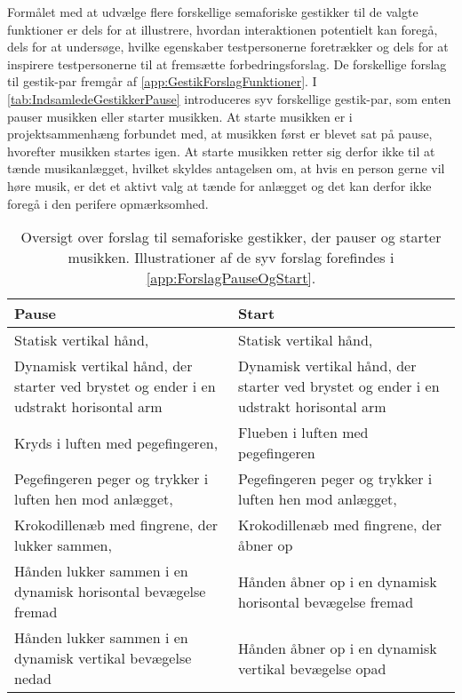 Formålet med at udvælge flere forskellige semaforiske gestikker til de valgte funktioner er dels for at illustrere, hvordan interaktionen potentielt kan foregå, dels for at undersøge, hvilke egenskaber testpersonerne foretrækker og dels for at inspirere testpersonerne til at fremsætte forbedringsforslag. De forskellige forslag til gestik-par fremgår af \autoref{app:GestikForslagFunktioner}.\blankline
%
I \autoref{tab:IndsamledeGestikkerPause} introduceres syv forskellige gestik-par, som enten pauser musikken eller starter musikken. At starte musikken er i projektsammenhæng forbundet med, at musikken først er blevet sat på pause, hvorefter musikken startes igen. At starte musikken retter sig derfor ikke til at tænde musikanlægget, hvilket skyldes antagelsen om, at hvis en person gerne vil høre musik, er det et aktivt valg at tænde for anlægget og det kan derfor ikke foregå i den perifere opmærksomhed.   
%
\begin{table}[H]
	\centering
	\begin{tabular}{| p{6cm} | p{6cm} | }
		\hline
		\textbf{Pause} & \textbf{Start} \\ \hline
		Statisk vertikal hånd, \parencite[s. 166]{PDF:ComparingInputModalities} & Statisk vertikal hånd, \parencite[s. 166]{PDF:ComparingInputModalities} \\ \hline
		Dynamisk vertikal hånd, der starter ved brystet og ender i en udstrakt horisontal arm  & Dynamisk vertikal hånd, der starter ved brystet og ender i en udstrakt horisontal arm  \\ \hline
		Kryds i luften med pegefingeren, \parencite[s. 48]{PDF:UserDefinedGesturesTV} & Flueben i luften med pegefingeren\\ \hline
		Pegefingeren peger og trykker i luften hen mod anlægget, \parencite{WEB:BeosoundMoment, WEB:Beosound2} & Pegefingeren peger og trykker i luften hen mod anlægget, \parencite[s. 48]{WEB:BeosoundMoment, WEB:Beosound2, PDF:UserDefinedGesturesTV} \\ \hline
		Krokodillenæb med fingrene, der lukker sammen, \parencite[s. 48]{PDF:UserDefinedGesturesTV} & Krokodillenæb med fingrene, der åbner op \\ \hline
		Hånden lukker sammen i en dynamisk horisontal bevægelse fremad & Hånden åbner op i en dynamisk horisontal bevægelse fremad \\ \hline
		Hånden lukker sammen i en dynamisk vertikal bevægelse nedad & Hånden åbner op i en dynamisk vertikal bevægelse opad  \\ \hline
	\end{tabular}
	\caption{Oversigt over forslag til semaforiske gestikker, der pauser og starter musikken. Illustrationer af de syv forslag forefindes i \autoref{app:ForslagPauseOgStart}.}
	\label{tab:IndsamledeGestikkerPause}
\end{table}
